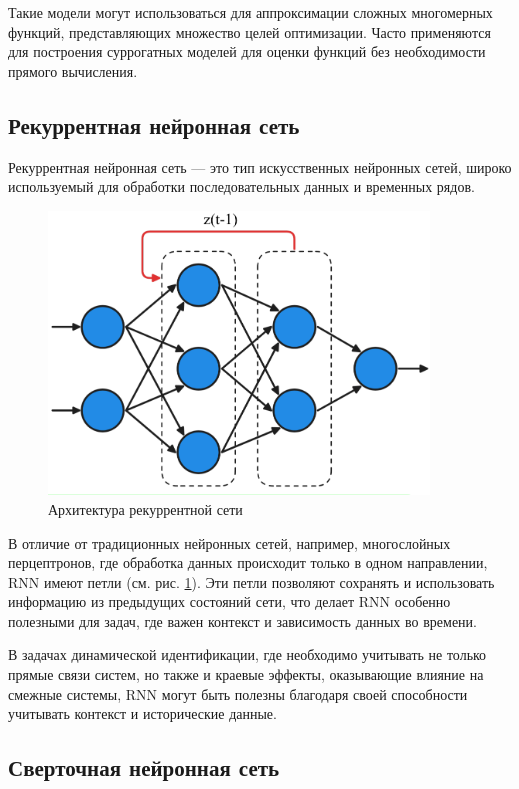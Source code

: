 Такие модели могут использоваться для аппроксимации сложных многомерных функций,
представляющих множество целей оптимизации. Часто применяются для построения
суррогатных моделей для оценки функций без необходимости прямого вычисления.

\subsection{Рекуррентная нейронная сеть}

Рекуррентная нейронная сеть — это тип искусственных нейронных сетей, широко
используемый для обработки последовательных данных и временных рядов. 

\begin{figure}[H]
  \centering
    \includegraphics[width=0.9\textwidth]{figures/arch_rnn.png}
  \caption{Архитектура рекуррентной сети}\label{fig:rnn}
\end{figure}

В отличие от традиционных нейронных сетей, например, многослойных перцептронов,
где обработка данных происходит только в одном направлении, RNN имеют петли (см.
рис. \ref{fig:rnn}). Эти петли позволяют сохранять и использовать информацию из
предыдущих состояний сети, что делает RNN особенно полезными для задач, где
важен контекст и зависимость данных во времени. 

В задачах динамической идентификации, где необходимо учитывать не только прямые
связи систем, но также и краевые эффекты, оказывающие влияние на смежные
системы, RNN могут быть полезны благодаря своей способности учитывать контекст и
исторические данные.

\subsection{Сверточная нейронная сеть}

